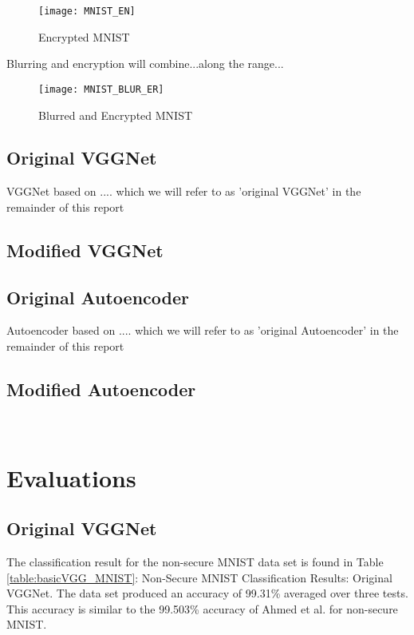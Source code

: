 \documentclass[12pt, titlepage]{article}
\begin{document}
\begin{figure}[h!]
	\begin{center}
		\texttt{[image: MNIST\_EN]}
		\caption{Encrypted MNIST}
		\label{MNIST_ENCRYPTED}
	\end{center}
\end{figure}


Blurring and encryption will combine...along the range...

\begin{figure}[h!]
	\begin{center}
		\texttt{[image: MNIST\_BLUR\_ER]}
		\caption{Blurred and Encrypted MNIST}
		\label{MNIST_BLURRED_EN}
	\end{center}
\end{figure} 
 
\subsection{Original VGGNet} 

VGGNet based on .... which we will refer to as 'original VGGNet' in the remainder of this report

\subsection{Modified VGGNet} 

\subsection{Original Autoencoder} 

Autoencoder based on .... which we will refer to as 'original Autoencoder' in the remainder of this report

\subsection{Modified Autoencoder} 
 
 ~\newpage
\section{Evaluations}
\subsection{Original VGGNet}\label{EvalOrigVGG}

The classification result for the non-secure MNIST data set is found in Table \ref{table:basicVGG_MNIST}: Non-Secure MNIST Classification Results: Original VGGNet. The data set produced an accuracy of 99.31\% averaged over three tests. This accuracy is similar to the 99.503\% accuracy of Ahmed et al. for non-secure MNIST.\\ 
\end{document}
